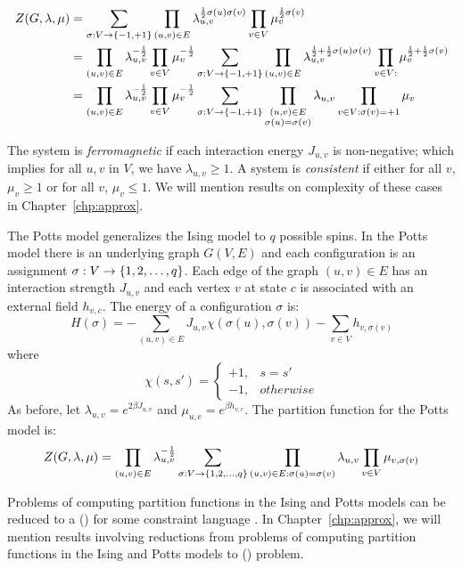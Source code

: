 \begin{align*}
Z(G,\lambda,\mu)&=\sum_{\sigma :V\to\{{-1,+1}\}} \prod_{(u,v)\in E} \lambda_{u,v}^{\frac{1}{2}
\sigma(u)\sigma(v)}\prod_{v\in V}\mu_v^{\frac{1}{2}\sigma(v)}\\
&=\prod_{(u,v)\in E}\lambda_{u,v}^{-\frac{1}{2}}\prod_{v\in V}\mu_v^{-\frac{1}{2}}\sum_{\sigma:V\to
\{{-1,+1}\}}
\prod_{(u,v)\in E}\lambda_{u,v}^{\frac{1}{2} + \frac{1}{2}\sigma(u)\sigma(v)}\prod_{v\in V:
}\mu_v^{\frac{1}{2} + \frac{1}{2}\sigma(v)} \\
&=\prod_{(u,v)\in E}\lambda_{u,v}^{-\frac{1}{2}}\prod_{v\in V}\mu_v^{-\frac{1}{2}}\sum_{\sigma:V\to
\{{-1,+1}\}}
\prod_{\substack{(u,v)\in E \\ \sigma(u)=\sigma(v)}}\lambda_{u,v}\prod_{v\in V:
\sigma(v)=+1}\mu_v
\end{align*}

The system is \emph{ferromagnetic} if each interaction energy \(J_{u,v}\) is non-negative; 
which implies for all \(u,v\) in \(V\), we have \(\lambda_{u,v} \ge 1\)\@.
A system is \emph{consistent} if
either for all \(v\), \(\mu_v\ge 1\) or for all \(v\), \(\mu_v \le 1\)\@. We will
mention results on complexity of these cases in Chapter~\ref{chp:approx}\@.

The Potts model generalizes the Ising model to \(q\) possible spins.
In the Potts model there is an underlying graph \(G(V,E)\) and 
each configuration is an assignment \(\sigma:V\to \{{{1,2,\dotsc,q}}\}\)\@.
Each edge of the graph \((u,v)\in E\) has an interaction
strength \(J_{u,v}\) and each vertex \(v\) at state \(c\) is associated with an
external field \(h_{v,c}\)\@. The energy of a configuration $\sigma$ is:
\[H(\sigma)=-\sum_{(u,v)\in E} J_{u,v}\chi(\sigma(u),\sigma(v)) - \sum_{v\in V} 
h_{v,\sigma(v)}\]
where
\[\chi(s,s')=\begin{cases}+1, & s=s'\\-1, & otherwise\end{cases}\]
As before, let \(\lambda_{u,v}=e^{2\beta J_{u,v}}\) and
\(\mu_{u,c}=e^{\beta h_{v,c}}\)\@. The partition function for the Potts model is:
\[Z(G,\lambda,\mu)=\prod_{(u,v)\in E}\lambda_{u,v}^{-\frac{1}{2}}
\sum_{\sigma:V\to\{{{1,2,\dotsc,q}}\}} \prod_{(u,v)\in E:\sigma(u)=\sigma(v)}\lambda_{u,v}
\prod_{v\in V}\mu_{v,\sigma(v)}\]

Problems of computing partition functions in the Ising and Potts models can be
reduced to a \ccsp(\mrelset) for some constraint language \mrelset\@.
In Chapter~\ref{chp:approx}, we will mention results involving reductions from problems
of computing partition functions in the Ising and Potts models to \ccsp(\mrelset) problem\@.


